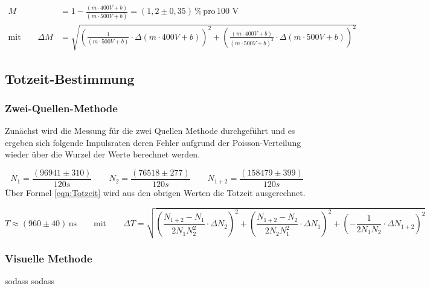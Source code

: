 \documentclass[titlepage = firstcover]{scrartcl}
\begin{document}
                \begin{align}
                    M &= 1-\frac{\left(m \cdot 400 V + b\right)}{\left(m \cdot 500 V + b\right)} = \left(1,2 \pm 0,35\right) \, \% \, \text{pro} \, \text{100 V} \\
                    \text{mit} \qquad \Delta M &= \sqrt{\left(\frac{1}{\left( m \cdot 500 V + b \right)} \cdot \Delta \left(m \cdot 400 V + b\right) \right)^2 + \left( \frac{ \left(m \cdot 400 V + b \right)}{\left(m \cdot 500 V + b \right)^2} \cdot \Delta \left(m \cdot 500 V + b \right)\right)^2}
                \end{align}


        \subsection{Totzeit-Bestimmung}
            \subsubsection*{Zwei-Quellen-Methode}
                Zunächst wird die Messung für die zwei Quellen Methode durchgeführt und es ergeben sich folgende Impulsraten deren Fehler aufgrund der Poisson-Verteilung wieder über die Wurzel
                der Werte berechnet werden. 

                \begin{equation}
                    N_1 = \frac{(96941 \pm 310)}{120s} \qquad N_2 = \frac{(76518 \pm 277)}{120s} \qquad N_{1+2} = \frac{(158479 \pm 399)}{120s}
                \end{equation}
                \noindent
                Über Formel \ref{eqn:Totzeit} wird aus den obrigen Werten die Totzeit ausgerechnet.

                \begin{equation}
                    T \approx \left(960 \pm 40\right) \, \text{ns} \qquad \text{mit} \qquad \Delta T = \sqrt{\left(\frac{N_{1+2}-N_1}{2N_1N_2^2} \cdot \Delta N_2\right)^2 + \left(\frac{N_{1+2}-N_2}{2N_2N_1^2} \cdot \Delta N_1\right)^2 + \left(-\frac{1}{2N_1N_2} \cdot \Delta N_{1+2}\right)^2}
                \end{equation}

            \subsubsection*{Visuelle Methode}   
                sodass      
                sodass
\end{document}

